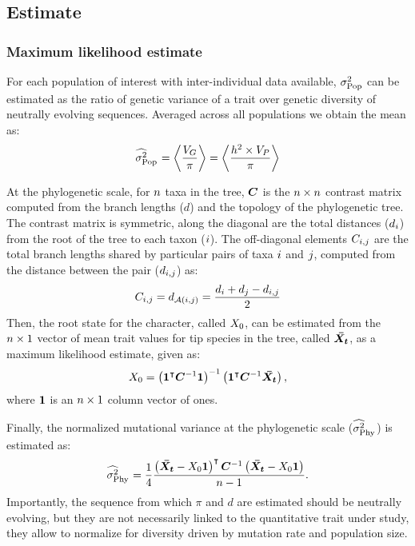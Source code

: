 \documentclass{article}
\begin{document}
\subsection{Estimate}

\subsubsection{Maximum likelihood estimate}
For each population of interest with inter-individual data available, $\sigma^2_{\text{Pop}}$ can be estimated as the ratio of genetic variance of a trait over genetic diversity of neutrally evolving sequences.
Averaged across all populations we obtain the mean as:
\begin{gather}
    \EstRatePop = \left< \frac{\VarGenetic}{\pi} \right> = \left< \frac{h^2 \Multiply \VarPhenotype }{\pi } \right> \label{eq:estimated-rate-pop}
\end{gather}

At the phylogenetic scale, for $n$ taxa in the tree, $\bm{C}$ is the $n \times n$ contrast matrix computed from the branch lengths ($d$) and the topology of the phylogenetic tree.
The contrast matrix is symmetric, along the diagonal are the total distances ($d_{i}$) from the root of the tree to each taxon ($i$).
The off-diagonal elements $C_{i,j}$ are the total branch lengths shared by particular pairs of taxa $i$ and $j$, computed from the distance between the pair ($d_{i,j}$) as:
\begin{gather}
    C_{i,j} = d_{\mathcal{A}(i, j)} = \frac{d_{i} + d_{j} - d_{i,j}}{2}
\end{gather}
Then, the root state for the character, called $X_{0}$, can be estimated from the $n \times 1$ vector of mean trait values for tip species in the tree, called $\bm{\bar{X_{t}}}$, as a maximum likelihood estimate\cite{omeara_testing_2006}, given as:
\begin{gather}
    X_{0} = \left( \bm{1}^{\intercal} \bm{C}^{-1} \bm{1} \right)^{-1} \left( \bm{1}^{\intercal} \bm{C}^{-1} \bm{\bar{X_{t}}} \right), \label{eq:estimated-root-trait}
\end{gather}
where $\bm{1}$ is an $n \times 1$ column vector of ones.

Finally, the normalized mutational variance at the phylogenetic scale ($\EstRatePhy$) is estimated\cite{omeara_testing_2006} as:
\begin{gather}
    \EstRatePhy = \frac{1}{4}\frac{\left( \VecTrait -  \RootTrait \VecOne \right)\tr \Cr\inv \left( \VecTrait -  \RootTrait  \VecOne  \right)}{\NbrSpecies - 1}. \label{eq:estimated-rate-phy}
\end{gather}
Importantly, the sequence from which $\pi$ and $d$ are estimated should be neutrally evolving, but they are not necessarily linked to the quantitative trait under study, they allow to normalize for diversity driven by mutation rate and population size.
\end{document}
